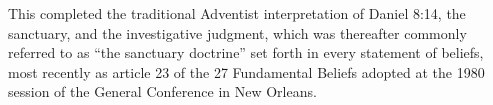 This completed the traditional Adventist interpretation of Daniel 8:14, the
sanctuary, and the investigative judgment, which was thereafter commonly
referred to as ``the sanctuary doctrine'' set forth in every statement of
beliefs, most recently as article 23 of the 27 Fundamental Beliefs adopted
at the 1980 session of the General Conference in New Orleans.
